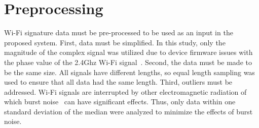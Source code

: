 \label{chp:Method}
\section{Preprocessing}
\label{sec:preprocessing}
Wi-Fi signature data must be pre-processed to be used as an input in the proposed system.
First, data must be simplified. In this study, only the magnitude of the complex signal was utilized due to device firmware issues with the phase value of the 2.4Ghz Wi-Fi signal~\cite{wang2015understanding}.
Second, the data must be made to be the same size. All signals have different lengths, so equal length sampling was used to ensure that all data had the same length.
Third, outliers must be addressed. Wi-Fi signals are interrupted by other electromagnetic radiation of which burst noise~\cite{wang2015understanding} can have significant effects. Thus, only data within one standard deviation of the median were analyzed to minimize the effects of burst noise.
